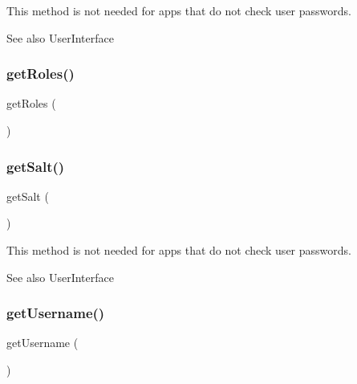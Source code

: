 This method is not needed for apps that do not check user passwords.

\begin{DoxySeeAlso}{See also}
User\+Interface 
\end{DoxySeeAlso}
\mbox{\label{class_app_1_1_entity_1_1_users_aa676cae5ee8d7fb6862a8724adc2660d}} 
\subsubsection{\texorpdfstring{get\+Roles()}{getRoles()}}
{\footnotesize\ttfamily get\+Roles (\begin{DoxyParamCaption}{ }\end{DoxyParamCaption})}

\mbox{\label{class_app_1_1_entity_1_1_users_a1dfe56d2c965d451a135f3f3910a8b8d}} 
\subsubsection{\texorpdfstring{get\+Salt()}{getSalt()}}
{\footnotesize\ttfamily get\+Salt (\begin{DoxyParamCaption}{ }\end{DoxyParamCaption})}

This method is not needed for apps that do not check user passwords.

\begin{DoxySeeAlso}{See also}
User\+Interface 
\end{DoxySeeAlso}
\mbox{\label{class_app_1_1_entity_1_1_users_a81b37a3c9d639574e394f80c1138c75e}} 
\subsubsection{\texorpdfstring{get\+Username()}{getUsername()}}
{\footnotesize\ttfamily get\+Username (\begin{DoxyParamCaption}{ }\end{DoxyParamCaption})}

